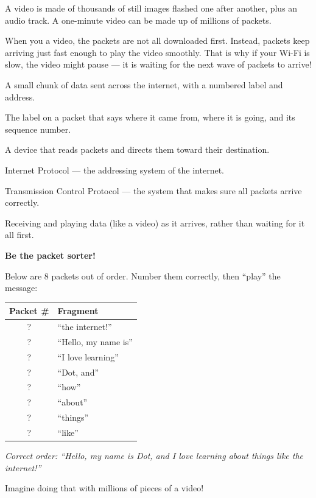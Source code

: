 A video is made of thousands of still images flashed one after another,
plus an audio track.
A one-minute video can be made up of millions of packets.

When you  a video, the packets are not all downloaded first.
Instead, packets keep arriving just fast enough to play the video smoothly.
That is why if your Wi-Fi is slow, the video might pause —
it is waiting for the next wave of packets to arrive!

\sectionrule

\begin{newwords}
  \begin{description}[labelwidth=3.2cm, leftmargin=3.4cm]
    \item[\term{Packet}]   A small chunk of data sent across the internet, with a numbered label and address.
    \item[\term{Header}]   The label on a packet that says where it came from, where it is going, and its sequence number.
    \item[\term{Router}]   A device that reads packets and directs them toward their destination.
    \item[\term{IP}]       Internet Protocol — the addressing system of the internet.
    \item[\term{TCP}]      Transmission Control Protocol — the system that makes sure all packets arrive correctly.
    \item[\term{Streaming}] Receiving and playing data (like a video) as it arrives, rather than waiting for it all first.
  \end{description}
\end{newwords}

\sectionrule

\begin{tryit}
  \textbf{Be the packet sorter!}

  Below are 8 packets out of order.
  Number them correctly, then ``play'' the message:

  \begin{center}
    \begin{tabular}{|c|l|}
      \hline
      \textbf{Packet \#} & \textbf{Fragment} \\
      \hline
      ?  & ``the internet!'' \\
      ?  & ``Hello, my name is'' \\
      ?  & ``I love learning'' \\
      ?  & ``Dot, and'' \\
      ?  & ``how'' \\
      ?  & ``about'' \\
      ?  & ``things'' \\
      ?  & ``like'' \\
      \hline
    \end{tabular}
  \end{center}

  \emph{Correct order: ``Hello, my name is Dot, and I love learning about things like the internet!''}

  Imagine doing that with millions of pieces of a video!
\end{tryit}

